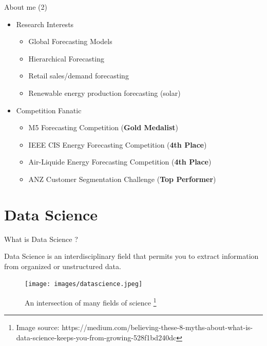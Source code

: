 \documentclass[12pt,ignorenonframetext,]{beamer}
\providecommand{\tightlist}{%
  \setlength{\itemsep}{0pt}\setlength{\parskip}{0pt}}
\begin{document}
\begin{frame}{About me (2)}
\protect\hypertarget{about-me-2}{}

\begin{itemize}
\tightlist
\item
  Research Interests

  \begin{itemize}
  \tightlist
  \item
    Global Forecasting Models
  \item
    Hierarchical Forecasting
  \item
    Retail sales/demand forecasting
  \item
    Renewable energy production forecasting (solar)
  \end{itemize}
\item
  Competition Fanatic

  \begin{itemize}
  \tightlist
  \item
    M5 Forecasting Competition (\textbf{Gold Medalist})
  \item
    IEEE CIS Energy Forecasting Competition (\textbf{4th Place})
  \item
    Air-Liquide Energy Forecasting Competition (\textbf{4th Place})
  \item
    ANZ Customer Segmentation Challenge (\textbf{Top Performer})
  \end{itemize}
\end{itemize}

\end{frame}

\hypertarget{data-science}{%
\section{Data Science}\label{data-science}}

\begin{frame}{What is Data Science ?}
\protect\hypertarget{what-is-data-science}{}

Data Science is an interdisciplinary field that permits you to extract
information from organized or unstructured data.

\begin{figure}
  \texttt{[image: images/datascience.jpeg]}
  \caption{An intersection of many fields of science%
    \footnote{%
     \tiny{Image source: https://medium.com/believing-these-8-myths-about-what-is-data-science-keeps-you-from-growing-528f1bd240dc} 
    }%
  }
\end{figure}

\end{frame}
\end{document}
